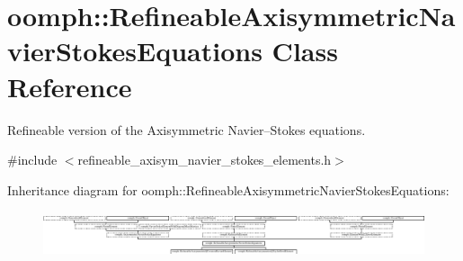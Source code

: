 \hypertarget{classoomph_1_1RefineableAxisymmetricNavierStokesEquations}{}\section{oomph\+:\+:Refineable\+Axisymmetric\+Navier\+Stokes\+Equations Class Reference}
\label{classoomph_1_1RefineableAxisymmetricNavierStokesEquations}


Refineable version of the Axisymmetric Navier--Stokes equations.  




{\ttfamily \#include $<$refineable\+\_\+axisym\+\_\+navier\+\_\+stokes\+\_\+elements.\+h$>$}

Inheritance diagram for oomph\+:\+:Refineable\+Axisymmetric\+Navier\+Stokes\+Equations\+:\begin{figure}[H]
\begin{center}
\leavevmode
\includegraphics[height=1.368524cm]{classoomph_1_1RefineableAxisymmetricNavierStokesEquations}
\end{center}
\end{figure}
